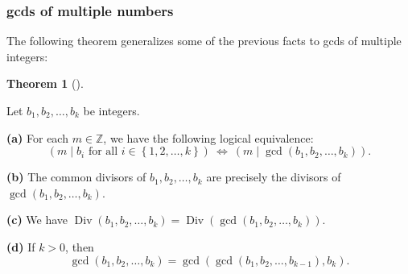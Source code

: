 \documentclass[numbers=enddot,12pt,final,onecolumn,notitlepage]{scrartcl}%
\numberwithin{exer}{subsection}
\theoremstyle{definition}
\newtheorem{theo}{Theorem}[subsection]
\newenvironment{theorem}[1][]
{\begin{theo}[#1]\begin{leftbar}}
{\end{leftbar}\end{theo}}
\begin{document}
\subsubsection{gcds of multiple numbers}

The following theorem generalizes some of the previous facts to gcds of
multiple integers:

\begin{theorem}
\label{thm.ent.gcd.uniprop-mul}Let $b_{1},b_{2},\ldots,b_{k}$ be integers.

\textbf{(a)} For each $m\in\mathbb{Z}$, we have the following logical
equivalence:%
\[
\left(  m\mid b_{i}\text{ for all }i\in\left\{  1,2,\ldots,k\right\}  \right)
\ \Longleftrightarrow\ \left(  m\mid\gcd\left(  b_{1},b_{2},\ldots
,b_{k}\right)  \right)  .
\]


\textbf{(b)} The common divisors of $b_{1},b_{2},\ldots,b_{k}$ are precisely
the divisors of $\gcd\left(  b_{1},b_{2},\ldots,b_{k}\right)  $.

\textbf{(c)} We have $\operatorname*{Div}\left(  b_{1},b_{2},\ldots
,b_{k}\right)  =\operatorname*{Div}\left(  \gcd\left(  b_{1},b_{2}%
,\ldots,b_{k}\right)  \right)  $.

\textbf{(d)} If $k>0$, then%
\[
\gcd\left(  b_{1},b_{2},\ldots,b_{k}\right)  =\gcd\left(  \gcd\left(
b_{1},b_{2},\ldots,b_{k-1}\right)  ,b_{k}\right)  .
\]

\end{theorem}
\end{document}
